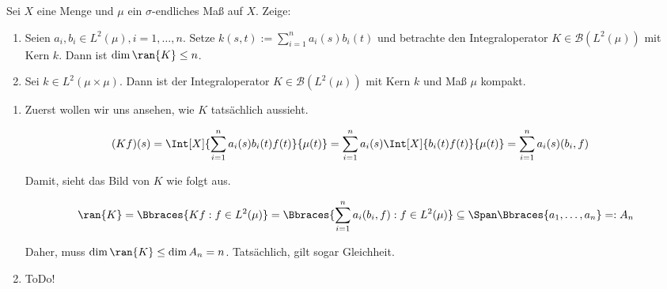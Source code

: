 \begin{exercise}[IO/2]

Sei $X$ eine Menge und $\mu$ ein $\sigma$-endliches Maß auf $X$.
Zeige:

\begin{enumerate}[label = (\alph*)]

  \item
  Seien $a_i, b_i \in L^2(\mu), i = 1, \ldots, n$.
  Setze $k(s, t) := \sum_{i=1}^n a_i(s) b_i(t)$ und betrachte den Integraloperator $K \in \mathcal{B}(L^2(\mu))$ mit Kern $k$.
  Dann ist $\dim{\ran{K}} \leq n$.

  \item
  Sei $k \in L^2(\mu \times \mu)$.
  Dann ist der Integraloperator $K \in \mathcal{B}(L^2(\mu))$ mit Kern $k$ und Maß $\mu$ kompakt.

\end{enumerate}

\end{exercise}

\begin{solution}

\phantom{}

\begin{enumerate}[label = (\alph*)]

  \item
  Zuerst wollen wir uns ansehen, wie $K$ tatsächlich aussieht.

  \begin{align*}
    (K f)(s)
    & =
    \Int[X]
    {
      \sum_{i=1}^n
      a_i(s) b_i(t) f(t)
    }{\mu(t)}
    =
    \sum_{i=1}^n
    a_i(s) \Int[X]{b_i(t) f(t)}{\mu(t)}
    =
    \sum_{i=1}^n
    a_i(s) (b_i, f)
  \end{align*}

  Damit, sieht das Bild von $K$ wie folgt aus.

  \begin{align*}
    \ran{K}
    =
    \Bbraces
    {
      K f:
      f \in L^2(\mu)
    }
    =
    \Bbraces
    {
      \sum_{i=1}^n
      a_i (b_i, f):
      f \in L^2(\mu)
    }
    \subseteq
    \Span \Bbraces{a_1, \ldots, a_n}
    =: A_n
  \end{align*}

  Daher, muss $\dim \ran{K} \leq \dim{A_n} = n$.
  Tatsächlich, gilt sogar Gleichheit.

  \item
  ToDo!

\end{enumerate}

\end{solution}
